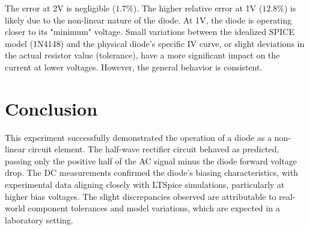 \documentclass{article}
\begin{document}
The error at 2V is negligible ($1.7\%$). The higher relative error at 1V ($12.8\%$) is likely due to the non-linear nature of the diode. At 1V, the diode is operating closer to its "minimum" voltage. Small variations between the idealized SPICE model (1N4148) and the physical diode's specific IV curve, or slight deviations in the actual resistor value (tolerance), have a more significant impact on the current at lower voltages. However, the general behavior is consistent.

\section{Conclusion}
This experiment successfully demonstrated the operation of a diode as a non-linear circuit element. The half-wave rectifier circuit behaved as predicted, passing only the positive half of the AC signal minus the diode forward voltage drop. The DC measurements confirmed the diode's biasing characteristics, with experimental data aligning closely with LTSpice simulations, particularly at higher bias voltages. The slight discrepancies observed are attributable to real-world component tolerances and model variations, which are expected in a laboratory setting.
\end{document}
